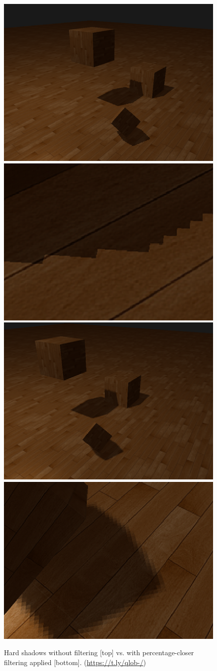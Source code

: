 \documentclass{article}
\begin{document}
\begin{figure}
	\includegraphics[width=.49\linewidth]{images/hard_shadows_no_filtering}\hfill
	\includegraphics[width=.49\linewidth]{images/hard_shadows_no_filtering_closeup}
	\\[\smallskipamount]
	\includegraphics[width=.49\linewidth]{images/hard_shadows_pcf}\hfill
	\includegraphics[width=.49\linewidth]{images/hard_shadows_pcf_closeup}
	\caption{Hard shadows without filtering [top] vs. with percentage-closer filtering applied [bottom]. (\url{https://t.ly/qlob-/})}
\end{figure}
\end{document}

